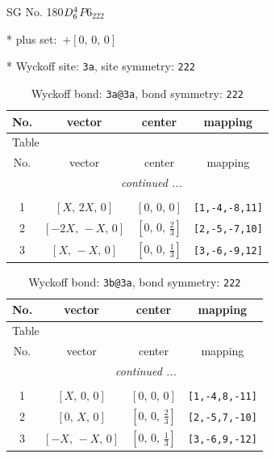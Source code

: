 \documentclass[fleqn,8pt]{jsarticle}
\begin{document}
\setcounter{MaxMatrixCols}{32}

\renewcommand{\tablename}{Table~}
\renewcommand{\figurename}{Figure~}
\begin{center}
\LARGE
SG No. 180\quad$D_{\rm 6}^{4}$\quad$P6_222$\quad[ hexagonal ]
\end{center}

* plus set:\,\,\,$+\left[ 0,\, 0,\, 0 \right]$


* Wyckoff site: {\tt 3a}, site symmetry: {\tt 222}
\renewcommand{\arraystretch}{1.2}
\begin{longtable}{cccc}
\caption{Wyckoff bond: {\tt 3a@3a}, bond symmetry: {\tt 222}}
 \\
 \hline \hline
No. & vector & center & mapping \\ \hline \endfirsthead

\multicolumn{3}{l}{\tablename\ \thetable{}} \\
 \hline \hline
No. & vector & center & mapping \\ \hline \endhead

 \hline \hline
\multicolumn{3}{r}{\footnotesize\it continued ...} \\ \endfoot

 \hline \hline
\multicolumn{3}{r}{} \\ \endlastfoot

1 & $\left[ X,\, 2 X,\, 0 \right]$ & $\left[ 0,\, 0,\, 0 \right]$ & {\tt [1,-4,-8,11]} \\ \hline
2 & $\left[ - 2 X,\, - X,\, 0 \right]$ & $\left[ 0,\, 0,\, \frac{2}{3} \right]$ & {\tt [2,-5,-7,10]} \\ \hline
3 & $\left[ X,\, - X,\, 0 \right]$ & $\left[ 0,\, 0,\, \frac{1}{3} \right]$ & {\tt [3,-6,-9,12]} \\
\end{longtable}
\renewcommand{\arraystretch}{1.2}
\begin{longtable}{cccc}
\caption{Wyckoff bond: {\tt 3b@3a}, bond symmetry: {\tt 222}}
 \\
 \hline \hline
No. & vector & center & mapping \\ \hline \endfirsthead

\multicolumn{3}{l}{\tablename\ \thetable{}} \\
 \hline \hline
No. & vector & center & mapping \\ \hline \endhead

 \hline \hline
\multicolumn{3}{r}{\footnotesize\it continued ...} \\ \endfoot

 \hline \hline
\multicolumn{3}{r}{} \\ \endlastfoot

1 & $\left[ X,\, 0,\, 0 \right]$ & $\left[ 0,\, 0,\, 0 \right]$ & {\tt [1,-4,8,-11]} \\ \hline
2 & $\left[ 0,\, X,\, 0 \right]$ & $\left[ 0,\, 0,\, \frac{2}{3} \right]$ & {\tt [2,-5,7,-10]} \\ \hline
3 & $\left[ - X,\, - X,\, 0 \right]$ & $\left[ 0,\, 0,\, \frac{1}{3} \right]$ & {\tt [3,-6,9,-12]} \\
\end{longtable}
\end{document}
